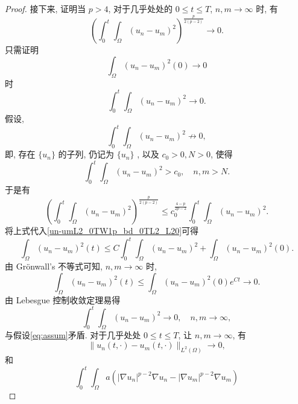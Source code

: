 \documentclass[oneside,longtitle]{LZUthesis}
\numberwithin{equation}{chapter}
\newcommand*\abs[1]{\lvert#1\rvert}
\newcommand*\norm[1]{\lVert#1\rVert}
\newcommand*\Brace[1]{\lbrace#1\rbrace}
\begin{document}
\begin{proof}
	接下来, 证明当 $p>4$, 对于几乎处处的 $0 \leq t \leq T$, $n, m \to \infty$ 时,
	有
	\begin{equation*}
		\left(\int_0^t\int_{\Omega}
			\left(u_n-u_m\right)^2\right)^{\frac{p}{2(p-2)}} \to 0.
	\end{equation*}
	只需证明
	\begin{equation*}
		\int_{\Omega}\left(u_n-u_m\right)^2(0) \to 0
	\end{equation*}
	时
	\begin{equation*}
		\int_0^t\int_{\Omega}\left(u_n-u_m\right)^2 \to 0.
	\end{equation*}
	假设,
	\begin{equation}\label{eq:assum}
		\int_0^t\int_{\Omega}\left(u_n-u_m\right)^2 \not\to 0,
	\end{equation}
	即, 存在 $\Brace{u_n}$ 的子列, 仍记为 $\Brace{u_n}$ , 以及 $c_0 > 0, N > 0$, 使得
	\begin{equation*}
		\int_0^t\int_{\Omega}\left(u_n-u_m\right)^2 > c_0, \quad n, m > N.
	\end{equation*}
	于是有
	\begin{equation*}
		\left(\int_0^t\int_{\Omega}\left(u_n-u_m\right)^2\right)^{\frac{p}{2(p-2)}}
		\leq c_0^{\frac{4-p}{2p-2}}\int_0^t\int_{\Omega}\left(u_n-u_m\right)^2.
	\end{equation*}
	将上式代入\cref{un-umL2_0TW1p_bd_0TL2_L20}可得
	\begin{equation*}
		\int_{\Omega}\left(u_n-u_m\right)^2(t)
		\leq C\int_0^t\int_{\Omega}\left(u_n-u_m\right)^2
		+ \int_{\Omega}\left(u_n-u_m\right)^2(0).
	\end{equation*}
	由 Gr\"onwall's 不等式可知, $n, m \to \infty$ 时,
	\begin{equation*}
		\int_{\Omega}\left( u_n-u_m \right)^2(t)
		\leq \int_{\Omega}\left(u_n-u_m\right)^2(0)e^{Ct} \to 0.
	\end{equation*}
	由 Lebesgue 控制收敛定理易得
	\begin{equation*}
		\int_0^t\int_{\Omega}\left(u_n-u_m\right)^2 \to 0, \quad n, m \to \infty,
	\end{equation*}
	与假设\eqref{eq:assum}矛盾. 对于几乎处处 $0 \leq t \leq T$, 让 $n,m \to \infty$, 有
	\begin{equation}\label{cauchy_in_L2}
		\norm{u_n(t,\cdot)-u_m(t,\cdot)}_{L^2(\Omega)} \to 0,
	\end{equation}
	和
	\begin{equation}\label{cauchy_in_W1pa}
		\int_{0}^{t}\int_{\Omega}a
		\left(\abs{\nabla u_n}^{p-2}\nabla u_n
		- \abs{\nabla u_m}^{p-2}\nabla u_m\right)

\end{equation}
\end{proof}
\end{document}
